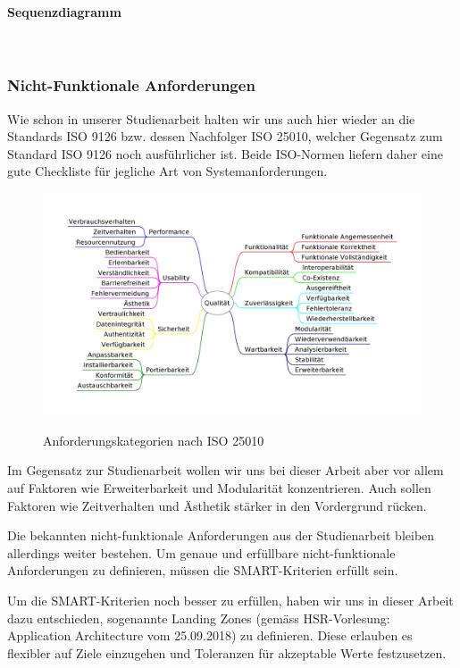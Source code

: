 \paragraph{Sequenzdiagramm}~\\

\subsubsection{Nicht-Funktionale Anforderungen}
Wie schon in unserer Studienarbeit halten wir uns auch hier wieder an die Standards ISO 9126\cite{ISO9126} bzw. dessen Nachfolger ISO 25010\cite{ISO9126_ISO25010}, welcher Gegensatz zum Standard ISO 9126 noch ausführlicher ist. Beide ISO-Normen liefern daher eine gute Checkliste für jegliche Art von Systemanforderungen.

\begin{figure}[h]
	\centering
	\includegraphics[width=1\linewidth]{img/anforderungen/quality}
	\caption[Anforderungskategorien nach ISO 25010]{Anforderungskategorien nach  ISO 25010}\cite{ISO25010_Bild}
	\label{fig:ISO 25010}
\end{figure}

Im Gegensatz zur Studienarbeit wollen wir uns bei dieser Arbeit aber vor allem auf Faktoren wie Erweiterbarkeit und Modularität konzentrieren. Auch sollen Faktoren wie Zeitverhalten und Ästhetik stärker in den Vordergrund rücken. 

Die bekannten nicht-funktionale Anforderungen aus der Studienarbeit bleiben allerdings weiter bestehen. Um genaue und erfüllbare nicht-funktionale Anforderungen zu definieren, müssen die SMART-Kriterien \cite{SMART} erfüllt sein.

Um die SMART-Kriterien noch besser zu erfüllen, haben wir uns in dieser Arbeit dazu entschieden, sogenannte Landing Zones (gemäss HSR-Vorlesung: Application Architecture vom 25.09.2018) zu definieren. Diese erlauben es flexibler auf Ziele einzugehen und Toleranzen für akzeptable Werte festzusetzen.

